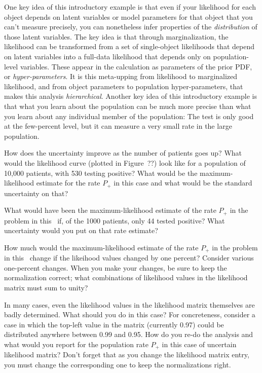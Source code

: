 \documentclass[12pt,twoside]{article}
\begin{document}
One key idea of this introductory example is that even if your
likelihood for each object depends on latent variables or model
parameters for that object that you can't measure precisely, you can
nonetheless infer properties of the \emph{distribution} of those
latent variables.  The key idea is that through marginalization, the
likelihood can be transformed from a set of single-object likelihoods
that depend on latent variables into a full-data likelihood that
depends only on population-level variables.  These appear in the
calculation as parameters of the prior PDF, or
\emph{hyper-parameters}.  It is this meta-upping from likelihood to
marginalized likelihood, and from object parameters to population
hyper-parameters, that makes this analysis \emph{hierarchical}.
Another key idea of this introductory example is that what you learn
about the population can be much more precise than what you learn
about any individual member of the population: The test is only good
at the few-percent level, but it can measure a very small rate in the
large population.

\begin{problem}
How does the uncertainty improve as the number of patients goes up?
What would the likelihood curve (plotted in Figure~??) look like for a
population of 10,000 patients, with 530 testing positive?  What would
be the maximum-likelihood estimate for the rate $P_+$ in this case and
what would be the standard uncertainty on that?
\end{problem}

\begin{problem}
What would have been the maximum-likelihood estimate of the rate $P_+$
in the problem in this \sectionname\ if, of the 1000 patients, only 44
tested positive?  What uncertainty would you put on that rate
estimate?
\end{problem}

\begin{problem}
How much would the maximum-likelihood estimate of the rate $P_+$ in the
problem in this \sectionname\ change if the likeihood values changed
by one percent?  Consider various one-percent changes.  When you make
your changes, be sure to keep the normalization correct; what
combinations of likelihood values in the likelihood matrix must sum to
unity?
\end{problem}

\begin{problem}
In many cases, even the likelihood values in the likelihood matrix
themselves are badly determined.  What should you do in this case?
For concreteness, consider a case in which the top-left value in the
matrix (currently 0.97) could be distributed anywhere between 0.99 and
0.95.  How do you re-do the analysis and what would you report for the
population rate $P_+$ in this case of uncertain likelihood matrix?
Don't forget that as you change the likelihood matrix entry, you must
change the corresponding one to keep the normalizations right.
\end{problem}
\end{document}
